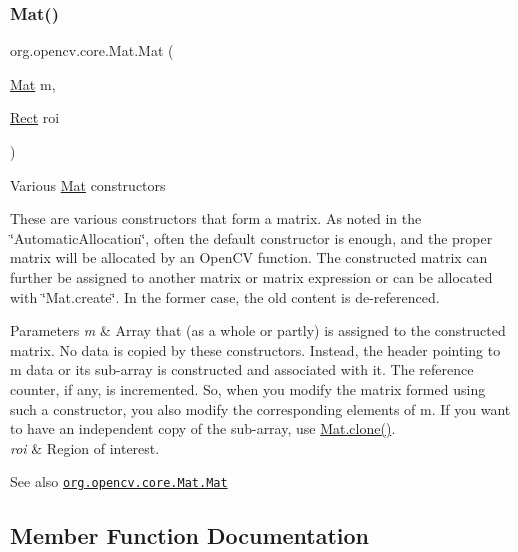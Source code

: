 \subsubsection{\texorpdfstring{Mat()}{Mat()}\hspace{0.1cm}{\footnotesize\ttfamily [9/9]}}
{\footnotesize\ttfamily org.\+opencv.\+core.\+Mat.\+Mat (\begin{DoxyParamCaption}\item[{\mbox{\hyperlink{classorg_1_1opencv_1_1core_1_1_mat}{Mat}}}]{m,  }\item[{\mbox{\hyperlink{classorg_1_1opencv_1_1core_1_1_rect}{Rect}}}]{roi }\end{DoxyParamCaption})}

Various \mbox{\hyperlink{classorg_1_1opencv_1_1core_1_1_mat}{Mat}} constructors

These are various constructors that form a matrix. As noted in the \char`\"{}\+Automatic\+Allocation\char`\"{}, often the default constructor is enough, and the proper matrix will be allocated by an Open\+CV function. The constructed matrix can further be assigned to another matrix or matrix expression or can be allocated with \char`\"{}\+Mat.\+create\char`\"{}. In the former case, the old content is de-\/referenced.


\begin{DoxyParams}{Parameters}
{\em m} & Array that (as a whole or partly) is assigned to the constructed matrix. No data is copied by these constructors. Instead, the header pointing to {\ttfamily m} data or its sub-\/array is constructed and associated with it. The reference counter, if any, is incremented. So, when you modify the matrix formed using such a constructor, you also modify the corresponding elements of {\ttfamily m}. If you want to have an independent copy of the sub-\/array, use {\ttfamily \mbox{\hyperlink{classorg_1_1opencv_1_1core_1_1_mat_a7e40ecb438d2ec75e24e209b7bee0be2}{Mat.\+clone()}}}. \\
\hline
{\em roi} & Region of interest.\\
\hline
\end{DoxyParams}
\begin{DoxySeeAlso}{See also}
\href{http://docs.opencv.org/modules/core/doc/basic_structures.html#mat-mat}{\tt org.\+opencv.\+core.\+Mat.\+Mat} 
\end{DoxySeeAlso}


\subsection{Member Function Documentation}
\mbox{\label{classorg_1_1opencv_1_1core_1_1_mat_a76da70f4d8bbf780fc2a351bdffc06ed}} 
